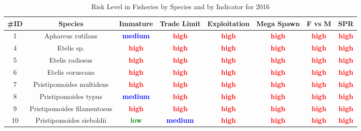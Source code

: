 \documentclass{report}\usepackage[]{graphicx}\usepackage[]{color}
\begin{document}
\begin{table}[ht]
\centering
\caption{Risk Level in Fisheries by Species and by Indicator for 2016} 
{\small
\begin{tabular}{cccccccc}
  \hline
\#ID & Species & Immature & Trade Limit & Exploitation & Mega Spawn & F vs M & SPR \\ 
  \hline
  1 & Aphareus rutilans & \textcolor{blue}{\textbf{medium}} & \textcolor{red}{\textbf{high}} & \textcolor{red}{\textbf{high}} & \textcolor{red}{\textbf{high}} & \textcolor{red}{\textbf{high}} & \textcolor{red}{\textbf{high}} \\ 
    4 & Etelis sp. & \textcolor{red}{\textbf{high}} & \textcolor{red}{\textbf{high}} & \textcolor{red}{\textbf{high}} & \textcolor{red}{\textbf{high}} & \textcolor{red}{\textbf{high}} & \textcolor{red}{\textbf{high}} \\ 
    5 & Etelis radiosus & \textcolor{red}{\textbf{high}} & \textcolor{red}{\textbf{high}} & \textcolor{red}{\textbf{high}} & \textcolor{red}{\textbf{high}} & \textcolor{red}{\textbf{high}} & \textcolor{red}{\textbf{high}} \\ 
    6 & Etelis coruscans & \textcolor{red}{\textbf{high}} & \textcolor{red}{\textbf{high}} & \textcolor{red}{\textbf{high}} & \textcolor{red}{\textbf{high}} & \textcolor{red}{\textbf{high}} & \textcolor{red}{\textbf{high}} \\ 
    7 & Pristipomoides multidens & \textcolor{red}{\textbf{high}} & \textcolor{red}{\textbf{high}} & \textcolor{red}{\textbf{high}} & \textcolor{red}{\textbf{high}} & \textcolor{red}{\textbf{high}} & \textcolor{red}{\textbf{high}} \\ 
    8 & Pristipomoides typus & \textcolor{blue}{\textbf{medium}} & \textcolor{red}{\textbf{high}} & \textcolor{red}{\textbf{high}} & \textcolor{red}{\textbf{high}} & \textcolor{red}{\textbf{high}} & \textcolor{red}{\textbf{high}} \\ 
    9 & Pristipomoides filamentosus & \textcolor{red}{\textbf{high}} & \textcolor{red}{\textbf{high}} & \textcolor{red}{\textbf{high}} & \textcolor{red}{\textbf{high}} & \textcolor{red}{\textbf{high}} & \textcolor{red}{\textbf{high}} \\ 
   10 & Pristipomoides sieboldii & \textcolor{green}{\textbf{low}} & \textcolor{blue}{\textbf{medium}} & \textcolor{red}{\textbf{high}} & \textcolor{red}{\textbf{high}} & \textcolor{red}{\textbf{high}} & \textcolor{red}{\textbf{high}} \\ 

\end{tabular}}
\end{table}
\end{document}
